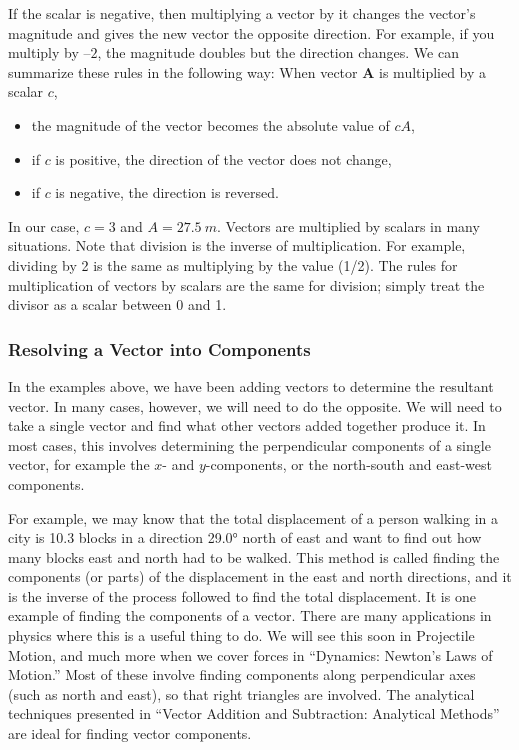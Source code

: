 \documentclass[../../main-ap-physics.tex]{subfiles}
\begin{document}
\vspace{1em}

If the scalar is negative, then multiplying a vector by it changes the vector's magnitude and gives the new vector the opposite direction. For example, if you multiply by $–2$, the magnitude doubles but the direction changes. We can summarize these rules in the following way: When vector \textbf{A} is multiplied by a scalar $c$,

\vspace{1ex}

\begin{itemize}
    \item the magnitude of the vector becomes the absolute value of $cA$,
    \item if $c$ is positive, the direction of the vector does not change,
    \item if $c$ is negative, the direction is reversed.
\end{itemize}

In our case,  $c=3$ and  $A = \SI{27.5}{m}$. Vectors are multiplied by scalars in many situations. Note that division is the inverse of multiplication. For example, dividing by 2 is the same as multiplying by the value (1/2). The rules for multiplication of vectors by scalars are the same for division; simply treat the divisor as a scalar between 0 and 1.

\subsubsection*{Resolving a Vector into Components}

In the examples above, we have been adding vectors to determine the resultant vector. In many cases, however, we will need to do the opposite. We will need to take a single vector and find what other vectors added together produce it. In most cases, this involves determining the perpendicular components of a single vector, for example the $x$- and $y$-components, or the north-south and east-west components.

\vspace{1em}

For example, we may know that the total displacement of a person walking in a city is 10.3 blocks in a direction \ang{29.0} north of east and want to find out how many blocks east and north had to be walked. This method is called finding the components (or parts) of the displacement in the east and north directions, and it is the inverse of the process followed to find the total displacement. It is one example of finding the components of a vector. There are many applications in physics where this is a useful thing to do. We will see this soon in Projectile Motion, and much more when we cover forces in ``Dynamics: Newton’s Laws of Motion.'' Most of these involve finding components along perpendicular axes (such as north and east), so that right triangles are involved. The analytical techniques presented in ``Vector Addition and Subtraction: Analytical Methods'' are ideal for finding vector components.
\end{document}
